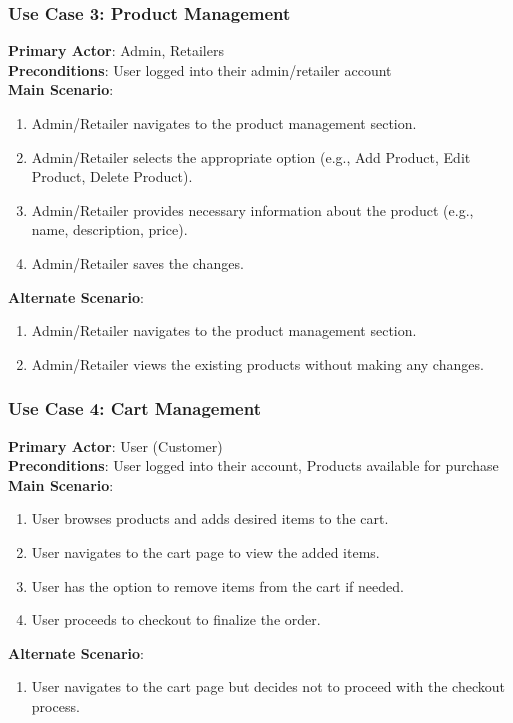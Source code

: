 \documentclass{article}
\begin{document}
\subsubsection{Use Case 3: Product Management}
\textbf{Primary Actor}: Admin, Retailers \\
\textbf{Preconditions}: User logged into their admin/retailer account \\
\textbf{Main Scenario}:
\begin{enumerate}
    \item Admin/Retailer navigates to the product management section.
    \item Admin/Retailer selects the appropriate option (e.g., Add Product, Edit Product, Delete Product).
    \item Admin/Retailer provides necessary information about the product (e.g., name, description, price).
    \item Admin/Retailer saves the changes.
\end{enumerate}
\textbf{Alternate Scenario}:
\begin{enumerate}
    \item Admin/Retailer navigates to the product management section.
    \item Admin/Retailer views the existing products without making any changes.
\end{enumerate}

\subsubsection{Use Case 4: Cart Management}
\textbf{Primary Actor}: User (Customer) \\
\textbf{Preconditions}: User logged into their account, Products available for purchase \\
\textbf{Main Scenario}:
\begin{enumerate}
    \item User browses products and adds desired items to the cart.
    \item User navigates to the cart page to view the added items.
    \item User has the option to remove items from the cart if needed.
    \item User proceeds to checkout to finalize the order.
\end{enumerate}
\textbf{Alternate Scenario}:
\begin{enumerate}
    \item User navigates to the cart page but decides not to proceed with the checkout process.
\end{enumerate}
\end{document}
